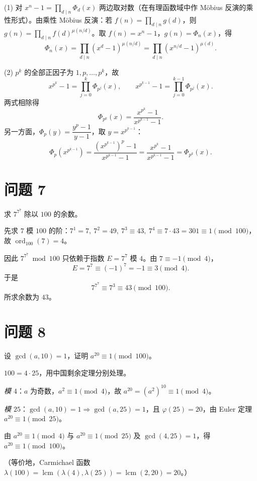 \documentclass{article}
\newcommand{\ord}{\operatorname{ord}}
\begin{document}
\begin{solution}
  (1) 对 $x^n-1=\prod_{d\mid n}\Phi_d(x)$ 两边取对数（在有理函数域中作 Möbius 反演的乘性形式）。由乘性 Möbius 反演：若 $f(n)=\prod_{d\mid n}g(d)$，则 $g(n)=\prod_{d\mid n}f(d)^{\mu(n/d)}$。取 $f(n)=x^n-1$，$g(n)=\Phi_n(x)$，得
  \[
    \boxed{\ \Phi_n(x)=\prod_{d\mid n}\left(x^{d}-1\right)^{\mu(n/d)}=\prod_{d\mid n}\left(x^{n/d}-1\right)^{\mu(d)}.\ }
  \]

  (2) $p^k$ 的全部正因子为 $1,p,\dots,p^k$，故
  \[
    x^{p^k}-1=\prod_{j=0}^{k}\Phi_{p^j}(x),\qquad
    x^{p^{k-1}}-1=\prod_{j=0}^{k-1}\Phi_{p^j}(x).
  \]
  两式相除得
  \[
    \Phi_{p^k}(x)=\frac{x^{p^k}-1}{x^{p^{k-1}}-1}.
  \]
  另一方面，$\Phi_p(y)=\dfrac{y^p-1}{y-1}$，取 $y=x^{p^{k-1}}$：
  \[
    \Phi_p\!\left(x^{p^{k-1}}\right)=\frac{\left(x^{p^{k-1}}\right)^p-1}{x^{p^{k-1}}-1}=\frac{x^{p^k}-1}{x^{p^{k-1}}-1}=\Phi_{p^k}(x).
  \]
\end{solution}

\section{问题 7}

求 $7^{7^{7}}$ 除以 $100$ 的余数。

\begin{solution}
  先求 $7$ 模 $100$ 的阶：$7^1=7,\ 7^2=49,\ 7^3\equiv 43,\ 7^4\equiv 7\cdot43=301\equiv 1\pmod{100}$，故 $\ord_{100}(7)=4$。

  因此 $7^{7^7}\bmod 100$ 只依赖于指数 $E=7^7$ 模 $4$。由 $7\equiv -1\pmod 4$，
  \[
    E=7^7\equiv(-1)^7=-1\equiv 3\pmod 4 .
  \]
  于是
  \[
    7^{7^7}\equiv 7^{3}\equiv 43\pmod{100}.
  \]
  所求余数为 $\boxed{43}$。
\end{solution}

\section{问题 8}

设 $\gcd(a,10)=1$，证明 $a^{20}\equiv 1\pmod{100}$。

\begin{solution}
  $100=4\cdot 25$，用中国剩余定理分别处理。

  \emph{模 $4$}：$a$ 为奇数，$a^2\equiv 1\pmod 4$，故 $a^{20}=(a^2)^{10}\equiv 1\pmod 4$。

  \emph{模 $25$}：$\gcd(a,10)=1\Rightarrow\gcd(a,25)=1$，且 $\varphi(25)=20$，由 Euler 定理 $a^{20}\equiv 1\pmod{25}$。

  由 $a^{20}\equiv 1\pmod 4$ 与 $a^{20}\equiv 1\pmod{25}$ 及 $\gcd(4,25)=1$，得 $a^{20}\equiv 1\pmod{100}$。

  （等价地，Carmichael 函数 $\lambda(100)=\operatorname{lcm}(\lambda(4),\lambda(25))=\operatorname{lcm}(2,20)=20$。）
\end{solution}
\end{document}
